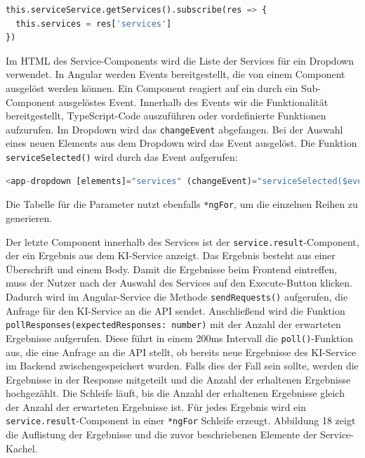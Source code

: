 \begin{lstlisting}[language=Python, caption={Subscriben auf einen Observable}]
this.serviceService.getServices().subscribe(res => {
  this.services = res['services']
})
\end{lstlisting}

Im HTML des Service-Components wird die Liste der Services für ein Dropdown verwendet. In Angular werden Events bereitgestellt, die von einem Component ausgelöst werden können. Ein Component reagiert auf ein durch ein Sub-Component ausgelöstes Event. Innerhalb des Events wir die Funktionalität bereitgestellt, TypeScript-Code auszuführen oder vordefinierte Funktionen aufzurufen. Im Dropdown wird das \texttt{changeEvent} abgefangen. Bei der Auswahl eines neuen Elements aus dem Dropdown wird das Event ausgelöst. Die Funktion \texttt{serviceSelected()} wird durch das Event aufgerufen:

\begin{lstlisting}[language=Python, caption={Dropdown zur Auswahl der Services}]
<app-dropdown [elements]="services" (changeEvent)="serviceSelected($event)"></app-dropdown>
\end{lstlisting}

Die Tabelle für die Parameter nutzt ebenfalls \texttt{*ngFor}, um die einzelnen Reihen zu generieren. 

Der letzte Component innerhalb des Services ist der \texttt{service.result}-Component, der ein Ergebnis aus dem KI-Service anzeigt. Das Ergebnis besteht aus einer Überschrift und einem Body. Damit die Ergebnisse beim Frontend eintreffen, muss der Nutzer nach der Auswahl des Services auf den Execute-Button klicken. Dadurch wird im Angular-Service die Methode \texttt{sendRequests()} aufgerufen, die Anfrage für den KI-Service an die API sendet. Anschließend wird die Funktion \texttt{pollResponses(expectedResponses: number)} mit der Anzahl der erwarteten Ergebnisse aufgerufen. Diese führt in einem 200ms Intervall die \texttt{poll()}-Funktion aus, die eine Anfrage an die API stellt, ob bereits neue Ergebnisse des KI-Service im Backend zwischengespeichert wurden. Falls dies der Fall sein sollte, werden die Ergebnisse in der Response mitgeteilt und die Anzahl der erhaltenen Ergebnisse hochgezählt. Die Schleife läuft, bis die Anzahl der erhaltenen Ergebnisse gleich der Anzahl der erwarteten Ergebnisse ist. Für jedes Ergebnis wird ein \texttt{service.result}-Component in einer \texttt{*ngFor} Schleife erzeugt. Abbildung 18 zeigt die Auflistung der Ergebnisse und die zuvor beschriebenen Elemente der Service-Kachel.

